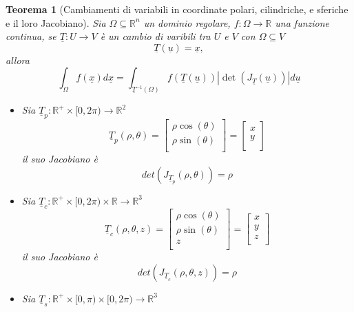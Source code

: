 \documentclass[12pt, a4paper]{article}
\theoremstyle{break}
\newtheorem{theorem}{Teorema} %
\begin{document}
\newpage
\begin{theorem} [Cambiamenti di variabili in coordinate polari, cilindriche, e
		sferiche e il loro Jacobiano]
	Sia $\Omega \subseteq \mathbb{R}^n$ un dominio regolare, $f: \Omega
		\to \mathbb{R}$ una funzione continua, se $\underline{T} : U \to
		V$ è un cambio di varibili tra $U$ e $V$ con $\Omega \subseteq V$
	\[
		\underline{T}(\underline{u}) = \underline{x},
	\]
	allora
	\[
		\int_{\Omega} f(\underline{x}) d \underline{x}
		= \int_{\underline{T}^{-1}(\Omega)} f(\underline{T}(\underline{u}))
		| \det(J_{\underline{T}}(\underline{u})) | d \underline{u}
	\]
	\begin{itemize}
		\item Sia $\underline{T}_p : \mathbb{R}^+ \times [0,2\pi) \to
			      \mathbb{R}^2$
		      \[
			      \underline{T}_p(\rho, \theta) =
			      \begin{bmatrix}
				      \rho \cos(\theta) \\
				      \rho \sin(\theta) \\
			      \end{bmatrix}
			      =
			      \begin{bmatrix}
				      x \\
				      y \\
			      \end{bmatrix}
		      \]
		      il suo Jacobiano è
		      \[
			      det(J_{\underline{T}_p} (\rho, \theta)) = \rho
		      \]
		\item Sia $\underline{T}_c : \mathbb{R}^+ \times
			      [0,2\pi) \times \mathbb{R} \to \mathbb{R}^3$
		      \[
			      \underline{T}_c (\rho, \theta, z) =
			      \begin{bmatrix}
				      \rho \cos(\theta) \\
				      \rho \sin(\theta) \\
				      z                 \\
			      \end{bmatrix}
			      =
			      \begin{bmatrix}
				      x \\
				      y \\
				      z \\
			      \end{bmatrix}
		      \]
		      il suo Jacobiano è
		      \[
			      det(J_{\underline{T}_c} (\rho, \theta, z)) = \rho
		      \]
		\item Sia $\underline{T}_s : \mathbb{R}^+ \times
			      [0,\pi) \times [0,2\pi) \to \mathbb{R}^3$
		      \[
\]
\end{itemize}
\end{theorem}
\end{document}
